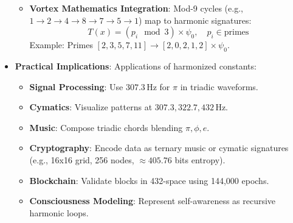 \begin{itemize}
\begin{itemize}
\begin{itemize}
        \end{itemize}
        \item \textbf{Vortex Mathematics Integration}: Mod-9 cycles (e.g., \( 1 \rightarrow 2 \rightarrow 4 \rightarrow 8 \rightarrow 7 \rightarrow 5 \rightarrow 1 \)) map to harmonic signatures:
        \[
        T(x) = (p_i \mod 3) \times \psi_0, \quad p_i \in \text{primes}
        \]
        Example: Primes \([2, 3, 5, 7, 11] \rightarrow [2, 0, 2, 1, 2] \times \psi_0\).
    \end{itemize}
    \item \texttt{} \textbf{Practical Implications}: Applications of harmonized constants:
    \begin{itemize}
        \item \textbf{Signal Processing}: Use \( 307.3 \, \text{Hz} \) for \(\pi\) in triadic waveforms.
        \item \textbf{Cymatics}: Visualize patterns at \( 307.3, 322.7, 432 \, \text{Hz} \).
        \item \textbf{Music}: Compose triadic chords blending \(\pi, \phi, e\).
        \item \textbf{Cryptography}: Encode data as ternary music or cymatic signatures (e.g., 16x16 grid, 256 nodes, \(\approx 405.76\) bits entropy).
        \item \textbf{Blockchain}: Validate blocks in 432-space using 144,000 epochs.
        \item \textbf{Consciousness Modeling}: Represent self-awareness as recursive harmonic loops.
    \end{itemize}
\end{itemize}

